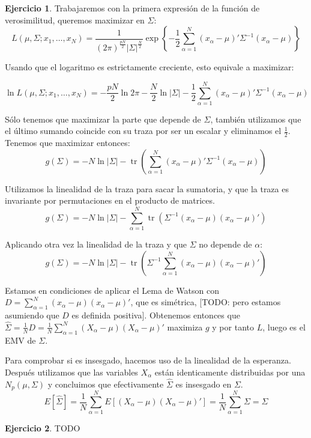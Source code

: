 \documentclass[12pt,spanish]{article}
\theoremstyle{definition}
\newtheorem{exercise}{Ejercicio}
\begin{document}
\begin{exercise} %

  Trabajaremos con la primera expresión de la función de verosimilitud, queremos maximizar en $\Sigma$:
  \[L(\mu,\Sigma;x_1,\ldots,x_N)=\frac{1}{(2\pi)^\frac{pN}{2}|\Sigma|^\frac{N}{2}}\exp\left\{-\frac{1}{2}\sum_{\alpha=1}^N(x_\alpha-\mu)'\Sigma^{-1}(x_\alpha-\mu)\right\}\]

  Usando que el logaritmo es estrictamente creciente, esto equivale a
  maximizar:

  \[\ln L(\mu,\Sigma;x_1,\ldots,x_N)=-\frac{pN}{2}\ln 2\pi-\frac{N}{2}\ln |\Sigma|-\frac{1}{2}\sum_{\alpha=1}^N(x_\alpha-\mu)'\Sigma^{-1}(x_\alpha-\mu)\]

  Sólo tenemos que maximizar la parte que depende de $\Sigma$, también
  utilizamos que el último sumando coincide con su traza por ser un
  escalar y eliminamos el $\frac{1}{2}$. Tenemos que maximizar
  entonces:
  \[g(\Sigma)=-N\ln |\Sigma|-\operatorname{tr}\left(\sum_{\alpha=1}^N(x_\alpha-\mu)'\Sigma^{-1}(x_\alpha-\mu)\right)\]

  Utilizamos la linealidad de la traza para sacar la sumatoria, y que
  la traza es invariante por permutaciones en el producto de matrices.
  \[g(\Sigma)=-N\ln |\Sigma|-\sum_{\alpha=1}^N\operatorname{tr}\left(\Sigma^{-1}(x_\alpha-\mu)(x_\alpha-\mu)'\right)\]

  Aplicando otra vez la linealidad de la traza y que $\Sigma$ no depende de $\alpha$:
  \[g(\Sigma)=-N\ln |\Sigma|-\operatorname{tr}\left(\Sigma^{-1}\sum_{\alpha=1}^N(x_\alpha-\mu)(x_\alpha-\mu)'\right)\]

  Estamos en condiciones de aplicar el Lema de Watson con
  $D=\sum_{\alpha=1}^N(x_\alpha-\mu)(x_\alpha-\mu)'$, que es
  simétrica, [TODO: pero estamos asumiendo que $D$ es definida
  positiva]. Obtenemos entonces que
  $\hat{\Sigma}=\frac{1}{N}D=\frac{1}{N}\sum_{\alpha=1}^N(X_\alpha-\mu)(X_\alpha-\mu)'$
  maximiza $g$ y por tanto $L$, luego es el EMV de $\Sigma$.

  Para comprobar si es insesgado, hacemos uso de la linealidad de la
  esperanza. Después utilizamos que las variables $X_\alpha$ están
  identicamente distribuidas por una $N_p(\mu,\Sigma)$ y concluimos
  que efectivamente $\hat{\Sigma}$ es insesgado en $\Sigma$.
  \[E[\hat{\Sigma}]=\frac{1}{N}\sum_{\alpha=1}^NE[(X_\alpha-\mu)(X_\alpha-\mu)']=\frac{1}{N}\sum_{\alpha=1}^N\Sigma=\Sigma\]
\end{exercise}

\begin{exercise} %
  TODO
\end{exercise}
\end{document}
